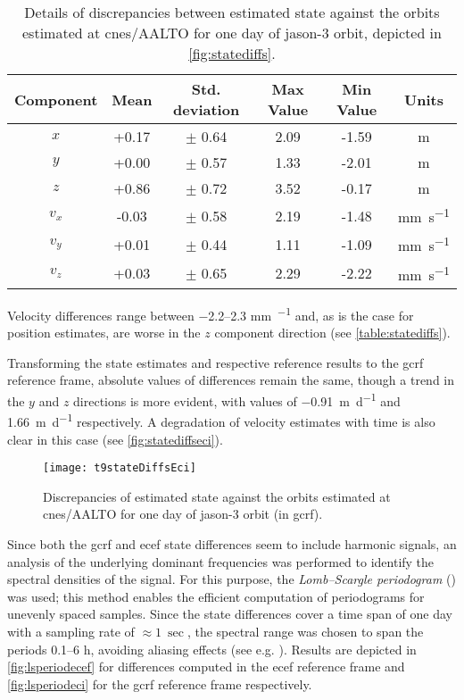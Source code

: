 \begin{table}[h!]
    \centering
    \begin{tabularx}{\textwidth}{cccccc}
        \toprule
        \textbf{Component} & \textbf{Mean} & \textbf{Std. deviation} & \textbf{Max Value} & \textbf{Min Value} & \textbf{Units}\\
        \hline
        $x$   &  +0.17 & $\pm$ 0.64 & 2.09 & -1.59 & \si{\metre}\\
        $y$   &  +0.00 & $\pm$ 0.57 & 1.33 & -2.01 & \si{\metre}\\
        $z$   &  +0.86 & $\pm$ 0.72 & 3.52 & -0.17 & \si{\metre}\\
        $v_x$ &  -0.03 & $\pm$ 0.58 & 2.19 & -1.48 & \si{\milli\metre\per\second}\\
        $v_y$ &  +0.01 & $\pm$ 0.44 & 1.11 & -1.09 & \si{\milli\metre\per\second}\\
        $v_z$ &  +0.03 & $\pm$ 0.65 & 2.29 & -2.22 & \si{\milli\metre\per\second}\\
       \bottomrule
    \end{tabularx}
    \caption{Details of discrepancies between estimated state against the orbits estimated at \gls{cnes}/AALTO for one day of \gls{jason}-3 orbit, depicted in \autoref{fig:statediffs}.}
    \label{table:statediffs}
\end{table}

Velocity differences range between \numrange{-2.2}{2.3} \si{\milli\metre\per\sec} and, as is the 
case for position estimates, are worse in the $z$ component direction (see 
\autoref{table:statediffs}).

Transforming the state estimates and respective reference results to the \gls{gcrf} 
reference frame, absolute values of differences remain the same, though a trend in 
the $y$ and $z$ directions is more evident, with values of \SI{-0.91}{\metre\per\day} 
and \SI{+1.66}{\metre\per\day} respectively. A degradation of velocity estimates with 
time is also clear in this case (see \autoref{fig:statediffseci}).

\begin{figure}
    \centering
    \texttt{[image: t9stateDiffsEci]}
    \caption{Discrepancies of estimated state against the orbits estimated at \gls{cnes}/AALTO for one day of \gls{jason}-3 orbit (in \gls{gcrf}).}
    \label{fig:statediffseci}
\end{figure}

Since both the \gls{gcrf} and \gls{ecef} state differences seem to include 
harmonic signals, an analysis of the underlying dominant frequencies was performed to 
identify the spectral densities of the signal. For this purpose, the 
\emph{Lomb–Scargle periodogram} (\cite{Scargle1982}) was used; this method enables 
the efficient computation of periodograms for unevenly spaced samples. Since the 
state differences cover a time span of one day with a sampling rate of $\approx \SI{1}{\sec}$, 
the spectral range was chosen to span the periods \numrange{0.1}{6} \si{\hour}, 
avoiding aliasing effects (see e.g. \cite{VanderPlas2018}). Results are depicted in 
\autoref{fig:lsperiodecef} for differences computed in the \gls{ecef} reference frame 
and \autoref{fig:lsperiodeci} for the \gls{gcrf} reference frame respectively.

